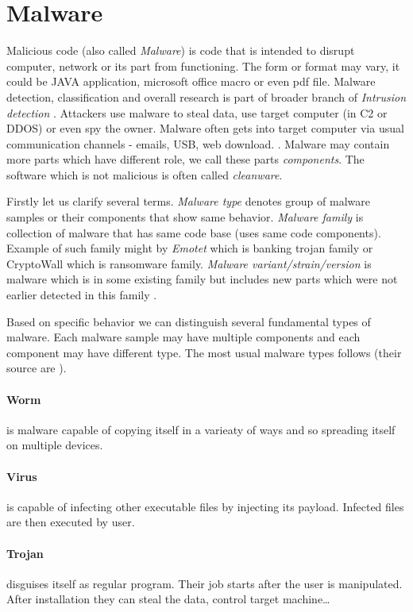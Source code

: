 
\section{Malware}
Malicious code (also called \emph{Malware}) is code that is intended to disrupt computer, network or its part from functioning. The form or format may vary, it could be JAVA application, microsoft office macro or even pdf file. Malware detection, classification and overall research is part of broader branch of \emph{Intrusion detection} \cite{Cole2009}. Attackers use malware to steal data, use target computer (in C2 or DDOS) or even spy the owner. Malware often gets into target computer via usual communication channels - emails, USB, web download. \cite{KA2018}. Malware may contain more parts which have different role, we call these parts \emph{components}. The software which is not malicious is often called \emph{cleanware}.

Firstly let us clarify several terms. \emph{Malware type} denotes group of malware samples or their components that show same behavior. \emph{Malware family} is collection of malware that has same code base (uses same code components). Example of such family might by \emph{Emotet} which is banking trojan family or CryptoWall which is ransomware family. \emph{Malware variant/strain/version} is malware which is in some existing family but includes new parts which were not earlier detected in this family \cite{Cohen2019}.

Based on specific behavior we can distinguish several fundamental types of malware. Each malware sample may have multiple components and each component may have different type. The most usual malware types follows (their source are \cite{Cole2009, KA2018, Graham2010, Sikorski2012}).

\paragraph{Worm} is malware capable of copying itself in a varieaty of ways and so spreading itself on multiple devices.
\paragraph{Virus} is capable of infecting other executable files by injecting its payload. Infected files are then executed by user.
\paragraph{Trojan} disguises itself as regular program. Their job starts after the user is manipulated. After installation they can steal the data, control target machine\dots
